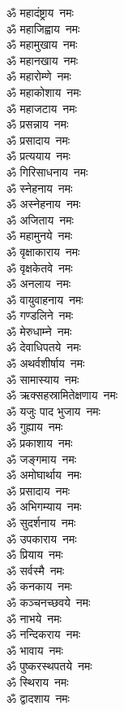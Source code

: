 \begin{multicols}{2}
\begin{flushleft}
ॐ महादंष्ट्राय~नमः\\
ॐ महाजिह्वाय~नमः\\
ॐ महामुखाय~नमः\\
ॐ महानखाय~नमः\\
ॐ महारोम्णे~नमः\\
ॐ महाकोशाय~नमः\\
ॐ महाजटाय~नमः\\
ॐ प्रसन्नाय~नमः\hfill{}\\
ॐ प्रसादाय~नमः\\
ॐ प्रत्ययाय~नमः\\
ॐ गिरिसाधनाय~नमः\\
ॐ स्नेहनाय~नमः\\
ॐ अस्नेहनाय~नमः\\
ॐ अजिताय~नमः\\
ॐ महामुनये~नमः\\
ॐ वृक्षाकाराय~नमः\\
ॐ वृक्षकेतवे~नमः\\
ॐ अनलाय~नमः\hfill{}\\
ॐ वायुवाहनाय~नमः\\
ॐ गण्डलिने~नमः\\
ॐ मेरुधाम्ने~नमः\\
ॐ देवाधिपतये~नमः\\
ॐ अथर्वशीर्षाय~नमः\\
ॐ सामास्याय~नमः\\
ॐ ऋक्सहस्रामितेक्षणाय~नमः\\
ॐ यजुः पाद भुजाय~नमः\\
ॐ गुह्याय~नमः\\
ॐ प्रकाशाय~नमः\hfill{}\\
ॐ जङ्गमाय~नमः\\
ॐ अमोघार्थाय~नमः\\
ॐ प्रसादाय~नमः\\
ॐ अभिगम्याय~नमः\\
ॐ सुदर्शनाय~नमः\\
ॐ उपकाराय~नमः\\
ॐ प्रियाय~नमः\\
ॐ सर्वस्मै~नमः\\
ॐ कनकाय~नमः\\
ॐ कञ्चनच्छवये~नमः\hfill{}\\
ॐ नाभये~नमः\\
ॐ नन्दिकराय~नमः\\
ॐ भावाय~नमः\\
ॐ पुष्करस्थपतये~नमः\\
ॐ स्थिराय~नमः\\
ॐ द्वादशाय~नमः\\

\end{flushleft}
\end{multicols}
